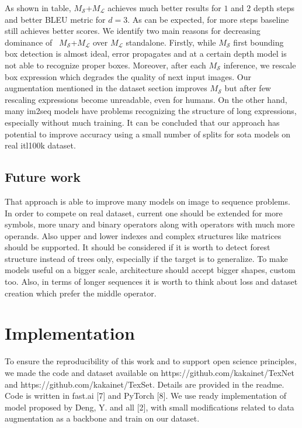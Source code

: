 \documentclass{sciposter}
\begin{document}
\begin{multicols}{3}
\begin{table}[ht]
\begin{tabular}{c| rr  }
\hline\hline  
\end{tabular} 
\label{tab:hresult} 
\end{table} 

As shown in table, $M_{\mathcal{S}}$+$M_{\mathcal{L}}$ achieves much better results for $1$ and $2$ depth steps and better BLEU metric for $d=3$. As can be expected, for more steps baseline still achieves better scores. We identify two main reasons for decreasing dominance of  $M_{\mathcal{S}}$+$M_{\mathcal{L}}$ over $M_{\mathcal{L}}$ standalone. Firstly, while $M_{\mathcal{S}}$ first bounding box detection is almost ideal, error propagates and at a certain depth model is not able to recognize proper boxes. Moreover, after each $M_{\mathcal{S}}$ inference, we rescale box expression which degrades the quality of next input images. Our augmentation mentioned in the dataset section improves $M_{\mathcal{S}}$ but after few rescaling expressions become unreadable, even for humans. On the other hand, many im2seq models have problems recognizing the structure of long expressions, especially without much training. It can be concluded that our approach has potential to improve accuracy using a small number of splits for sota models on real itl100k dataset.


\subsection{Future work}
That approach is able to improve many models on image to sequence problems. In order to compete on real dataset, current one should be extended for more symbols, more unary and binary operators along with operators with much more operands. Also upper and lower indexes and complex structures like matrices should be supported. It should be considered if it is worth to detect forest structure instead of trees only, especially if the target is to generalize. To make models useful on a bigger scale, architecture should accept bigger shapes, custom too. Also, in terms of longer sequences it is worth to think about loss and dataset creation which prefer the middle operator.

\section{Implementation}

To ensure the reproducibility of this work and to support open science principles, we made the code and dataset available on https://github.com/kakainet/TexNet and https://github.com/kakainet/TexSet. Details are provided in the readme. Code is written in fast.ai [7] and PyTorch [8]. We use ready implementation of model proposed by Deng, Y. and all [2], with small modifications related to data augmentation as a backbone and train on our dataset.
 

\end{multicols}
\end{document}
